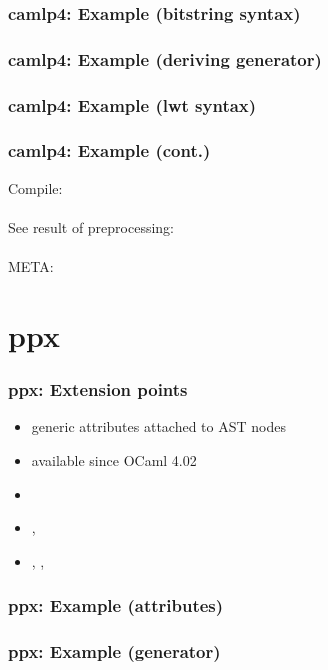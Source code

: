 \begin{frame}
\frametitle{camlp4: Example (bitstring syntax)}

\end{frame}

\begin{frame}
\frametitle{camlp4: Example (deriving generator)}

\end{frame}

\begin{frame}
\frametitle{camlp4: Example (lwt syntax)}


\end{frame}

\begin{frame}
\frametitle{camlp4: Example (cont.)}
Compile:
\\
\\
See result of preprocessing:
\\
\\
META:

\end{frame}

\section{ppx}

\begin{frame}
\frametitle{ppx: Extension points}
\begin{itemize}
\item generic attributes attached to AST nodes
\item available since OCaml 4.02
\item {}
\item {}, 
\item {}, , 
\end{itemize}
\end{frame}

\begin{frame}
\frametitle{ppx: Example (attributes)}

\end{frame}

\begin{frame}
\frametitle{ppx: Example (generator)}

\end{frame}

